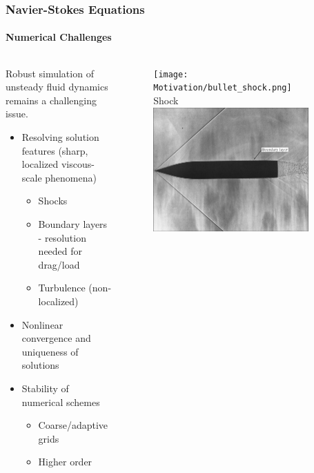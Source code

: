 \documentclass[18pt,xcolor=table]{beamer}
\begin{document}
\begin{frame}[t]
\frametitle{Navier-Stokes Equations}
\framesubtitle{Numerical Challenges}
\begin{columns}[c]
\begin{column}{.6\textwidth}
Robust simulation of unsteady fluid dynamics remains a challenging issue.
\vspace{2ex}

\begin{itemize}
\item{} Resolving solution features (sharp, localized viscous-scale phenomena)
\begin{itemize}
\item{} Shocks
\item{} Boundary layers - resolution needed for drag/load
\item{} Turbulence (non-localized)
\end{itemize}
\item{} Nonlinear convergence and uniqueness of solutions
\item{} Stability of numerical schemes
\begin{itemize}
\item{} Coarse/adaptive grids
\item{} Higher order
\end{itemize}
\end{itemize}
\vspace{-3ex}
\end{column}
\begin{column}{.4\textwidth}
\vspace{-3ex}
\begin{figure}
\centering
\texttt{[image: Motivation/bullet\_shock.png]}\\
Shock\\\vspace{1ex}
\includegraphics[width=0.9\textwidth]{Motivation/boundary_layer.png}\\

\end{figure}
\end{column}
\end{columns}
\end{frame}
\end{document}
